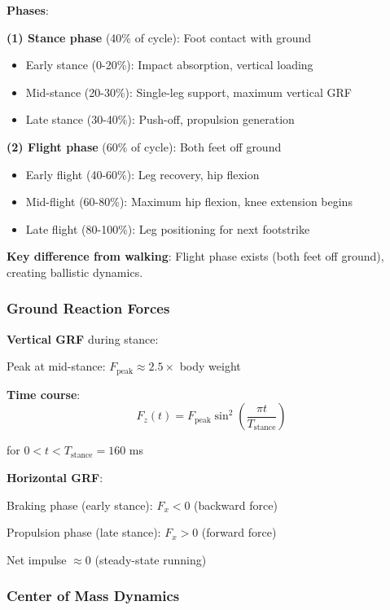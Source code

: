 \documentclass[11pt,onecolumn]{article}
\begin{document}
\textbf{Phases}:

\textbf{(1) Stance phase} (40\% of cycle): Foot contact with ground
\begin{itemize}
\item Early stance (0-20\%): Impact absorption, vertical loading
\item Mid-stance (20-30\%): Single-leg support, maximum vertical GRF
\item Late stance (30-40\%): Push-off, propulsion generation
\end{itemize}

\textbf{(2) Flight phase} (60\% of cycle): Both feet off ground
\begin{itemize}
\item Early flight (40-60\%): Leg recovery, hip flexion
\item Mid-flight (60-80\%): Maximum hip flexion, knee extension begins
\item Late flight (80-100\%): Leg positioning for next footstrike
\end{itemize}

\textbf{Key difference from walking}: Flight phase exists (both feet off ground), creating ballistic dynamics.

\subsubsection{Ground Reaction Forces}

\textbf{Vertical GRF} during stance:

Peak at mid-stance: $F_{\text{peak}} \approx 2.5 \times$ body weight

\textbf{Time course}:
\begin{equation}
F_z(t) = F_{\text{peak}}\sin^2\left(\frac{\pi t}{T_{\text{stance}}}\right)
\end{equation}

for $0 < t < T_{\text{stance}} = 160$ ms

\textbf{Horizontal GRF}:

Braking phase (early stance): $F_x < 0$ (backward force)

Propulsion phase (late stance): $F_x > 0$ (forward force)

Net impulse $\approx 0$ (steady-state running)

\subsubsection{Center of Mass Dynamics}
\end{document}
